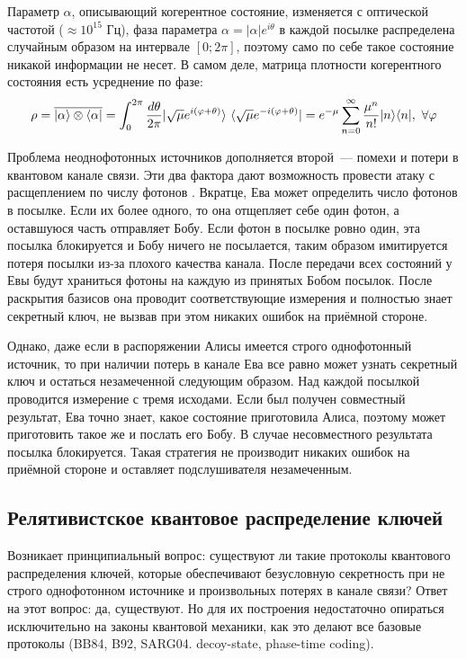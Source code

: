 Параметр $\alpha$, описывающий когерентное состояние, изменяется с оптической частотой ($\approx 10^{15}$ Гц), фаза параметра $\alpha = |\alpha|e^{i\theta}$
в каждой посылке распределена случайным образом на интервале $[0; 2\pi]$, поэтому само по себе такое состояние никакой информации не несет. В самом деле, матрица плотности когерентного состояния есть усреднение по фазе:
\begin{equation}\label{eva_density_matrix_one_half}
    \rho = \overline{\left| \alpha \right\rangle\otimes\left\langle \alpha \right|} = \int^{2\pi}_0 
{\frac{d\theta}{2\pi} 
|\sqrt{\mu} e^{i(\varphi + \theta)} \rangle ~ 
 \langle \sqrt{\mu}e^{-i(\varphi + \theta)} | } = 
e^{-\mu} \sum^\infty_{n=0} {\frac{\mu^n}{n!} |n\rangle \langle n | },~\forall \varphi
\end{equation}

Проблема неоднофотонных источников дополняется второй~--- помехи и потери в квантовом канале связи. Эти два фактора дают возможность провести атаку с расщеплением по числу фотонов \cite{pns_attack}. Вкратце, Ева может определить число фотонов в посылке. Если их более одного, то она отщепляет себе один фотон, а оставшуюся часть отправляет Бобу. Если фотон в посылке ровно один, эта посылка блокируется и Бобу ничего не посылается, таким образом имитируется потеря посылки из-за плохого качества канала.
После передачи всех состояний у Евы будут храниться фотоны на каждую из принятых Бобом посылок. После раскрытия базисов она проводит соответствующие измерения и полностью знает секретный ключ, не вызвав при этом никаких ошибок на приёмной стороне.

Однако, даже если в распоряжении Алисы имеется строго однофотонный источник, то при наличии потерь в канале Ева все равно может узнать \cite{uds_attack} секретный ключ и остаться незамеченной следующим образом. Над каждой посылкой проводится измерение с тремя исходами. Если был получен совместный результат, Ева точно знает, какое состояние приготовила Алиса, поэтому может приготовить такое же и послать его Бобу. В случае несовместного результата посылка блокируется. Такая стратегия не производит никаких ошибок на приёмной стороне и оставляет подслушивателя незамеченным.

\subsection{Релятивистское квантовое распределение ключей}
Возникает принципиальный вопрос: существуют ли такие протоколы квантового распределения ключей, которые обеспечивают безусловную секретность при не строго однофотонном источнике и произвольных потерях в канале связи? Ответ на этот вопрос: да, существуют. Но для их построения недостаточно опираться исключительно на законы квантовой механики, как это делают все базовые протоколы (BB84\cite{bb84}, B92\cite{non_orthogonal_states_discrimination_theorem}, SARG04\cite{sarg04}. decoy-state\cite{decoy_states_protocol}, phase-time coding\cite{phase_time_protocol}). 

